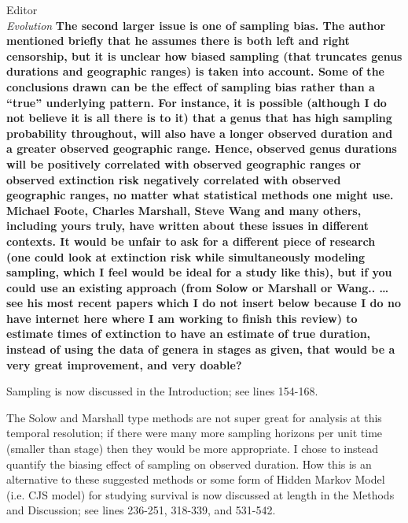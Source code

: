 \documentclass{letter}
\begin{document}
\begin{letter}{Editor \\ \textit{Evolution}}
  \textbf{The second larger issue is one of sampling bias. The author mentioned briefly that he assumes there is both left and right censorship, but it is unclear how biased sampling (that truncates genus durations and geographic ranges) is taken into account. Some of the conclusions drawn can be the effect of sampling bias rather than a “true” underlying pattern. For instance, it is possible (although I do not believe it is all there is to it) that a genus that has high sampling probability throughout, will also have a longer observed duration and a greater observed geographic range. Hence, observed genus durations will be positively correlated with observed geographic ranges or observed extinction risk negatively correlated with observed geographic ranges, no matter what statistical methods one might use. Michael Foote, Charles Marshall, Steve Wang and many others, including yours truly, have written about these issues in different contexts. It would be unfair to ask for a different piece of research (one could look at extinction risk while simultaneously modeling sampling, which I feel would be ideal for a study like this), but if you could use an existing approach (from Solow or Marshall or Wang.. …see his most recent papers which I do not insert below because I do no have internet here where I am working to finish this review) to estimate times of extinction to have an estimate of true duration, instead of using the data of genera in stages as given, that would be a very great improvement, and very doable?}

  Sampling is now discussed in the Introduction; see lines 154-168.

  The Solow and Marshall type methods are not super great for analysis at this temporal resolution; if there were many more sampling horizons per unit time (smaller than stage) then they would be more appropriate. I chose to instead quantify the biasing effect of sampling on observed duration. How this is an alternative to these suggested methods or some form of Hidden Markov Model (i.e. CJS model) for studying survival is now discussed at length in the Methods and Discussion; see lines 236-251, 318-339, and 531-542.



\end{letter}
\end{document}

